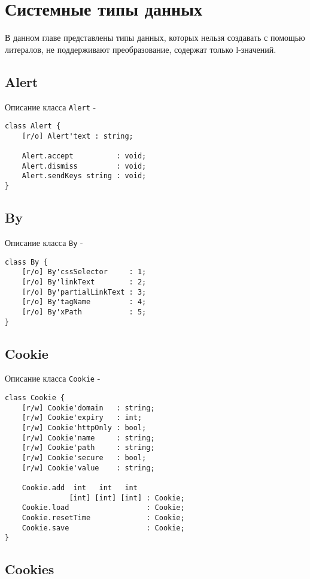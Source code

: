 \section{Системные типы данных}

В данном главе представлены типы данных, которых нельзя создавать с помощью литералов, не поддерживают преобразование, содержат только l-значений.

\subsection{{\color{orange} Alert}}

\noindent Описание класса \texttt{Alert} -
\begin{verbatim}
class Alert {
    [r/o] Alert'text : string;
	
    Alert.accept          : void;
	Alert.dismiss         : void;
	Alert.sendKeys string : void;
}
\end{verbatim}

\subsection{{\color{orange} By}}

\noindent Описание класса \texttt{By} -
\begin{verbatim}
class By {
    [r/o] By'cssSelector     : 1;
	[r/o] By'linkText        : 2;
	[r/o] By'partialLinkText : 3;
	[r/o] By'tagName         : 4;
	[r/o] By'xPath           : 5;
}
\end{verbatim}

\subsection{{\color{orange} Cookie}}

\noindent Описание класса \texttt{Cookie} -
\begin{verbatim}
class Cookie {
    [r/w] Cookie'domain   : string;
	[r/w] Cookie'expiry   : int;
	[r/w] Cookie'httpOnly : bool;
	[r/w] Cookie'name     : string;
	[r/w] Cookie'path     : string;
	[r/w] Cookie'secure   : bool;
	[r/w] Cookie'value    : string;
	
    Cookie.add  int   int   int
	           [int] [int] [int] : Cookie;
	Cookie.load                  : Cookie;
	Cookie.resetTime             : Cookie;
	Cookie.save                  : Cookie;
}
\end{verbatim}

\subsection{{\color{orange} Cookies}}

